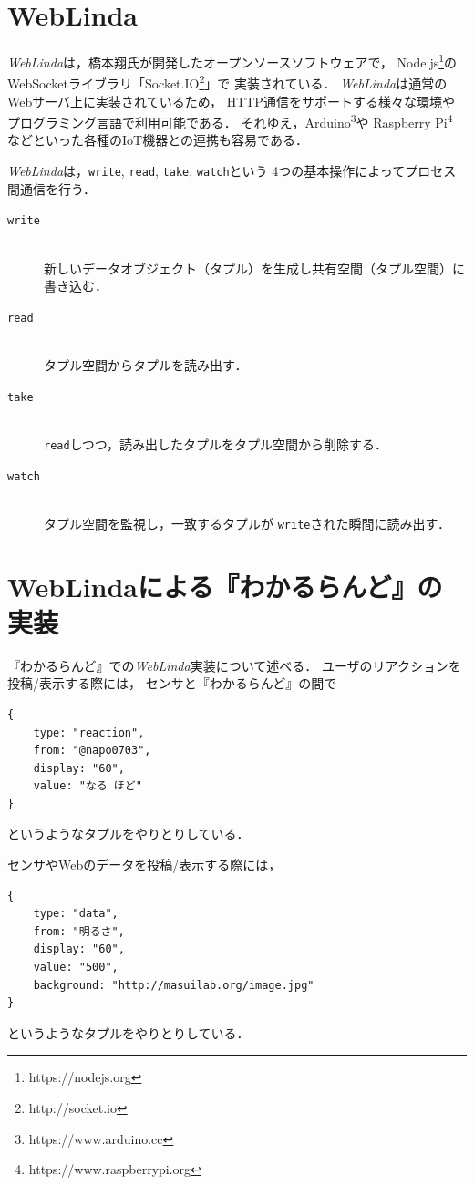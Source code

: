\section{WebLinda}

\textit{WebLinda}は，橋本翔氏が開発したオープンソースソフトウェアで，
Node.js\footnote{https://nodejs.org}の
WebSocketライブラリ「Socket.IO\footnote{http://socket.io}」で
実装されている．
\textit{WebLinda}は通常のWebサーバ上に実装されているため，
HTTP通信をサポートする様々な環境やプログラミング言語で利用可能である．
それゆえ，Arduino\footnote{https://www.arduino.cc}や
Raspberry Pi\footnote{https://www.raspberrypi.org}
などといった各種のIoT機器との連携も容易である．

\textit{WebLinda}は，\texttt{write}, \texttt{read}, \texttt{take}, \texttt{watch}という
4つの基本操作によってプロセス間通信を行う．

\vspace{2mm}
\begin{description}
\item[\texttt{write}]\mbox{}\\
新しいデータオブジェクト（タプル）を生成し共有空間（タプル空間）に書き込む．
\item[\texttt{read}]\mbox{}\\
タプル空間からタプルを読み出す．
\item[\texttt{take}]\mbox{}\\
\texttt{read}しつつ，読み出したタプルをタプル空間から削除する．
\item[\texttt{watch}]\mbox{}\\
タプル空間を監視し，一致するタプルが
\texttt{write}された瞬間に読み出す．
\end{description}

\section{WebLindaによる『わかるらんど』の実装}

『わかるらんど』での\textit{WebLinda}実装について述べる．
ユーザのリアクションを投稿/表示する際には，
センサと『わかるらんど』の間で

\vspace{4mm}
\begin{lstlisting}
{
    type: "reaction",
    from: "@napo0703",
    display: "60",
    value: "なる ほど"
}
\end{lstlisting}
というようなタプルをやりとりしている．

センサやWebのデータを投稿/表示する際には，
\vspace{4mm}
\begin{lstlisting}
{
    type: "data",
    from: "明るさ",
    display: "60",
    value: "500",
    background: "http://masuilab.org/image.jpg"
}
\end{lstlisting}
というようなタプルをやりとりしている．

